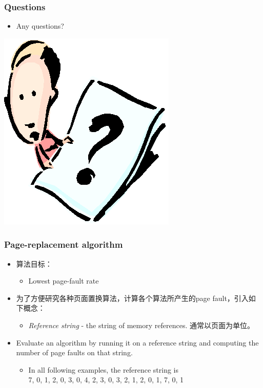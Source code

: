 \documentclass[CJKutf8,xcolor=pdftex,dvipsnames,table]{beamer}
\begin{document}
\begin{CJK*}{UTF8}{song}
  \begin{frame}
    \frametitle{Questions}
    \begin{itemize}
    \item{Any questions?}
    \end{itemize}
    \begin{center}
      \includegraphics[scale=.5]{question}
    \end{center}
  \end{frame}

  \begin{frame}
    \frametitle{Page-replacement algorithm} \pause
    \begin{itemize}
    \item{算法目标：} \pause
      \begin{itemize}
      \item{Lowest page-fault rate} \pause
      \end{itemize}
    \item{为了方便研究各种页面置换算法，计算各个算法所产生的page fault，引入如下概念：} \pause
      \begin{itemize}
      \item{\emph{Reference string} \pause - the string of memory references. \pause 通常以页面为单位。} \pause
      \end{itemize}
    \item{Evaluate an algorithm by running it on a reference string and computing the number of page faults on that string.} \pause
      \begin{itemize}
      \item{In all following examples, the reference string is\\7, 0, 1, 2, 0, 3, 0, 4, 2, 3, 0, 3, 2, 1, 2, 0, 1, 7, 0, 1}
      \end{itemize}
    \end{itemize}
  \end{frame}
  

\end{CJK*}
\end{document}
